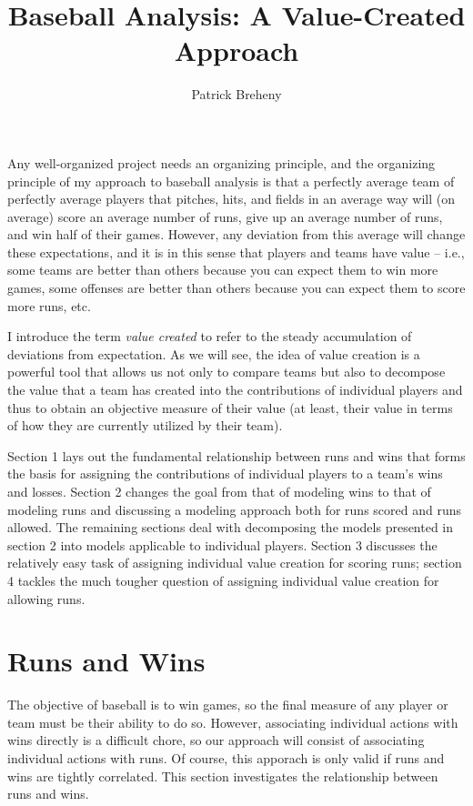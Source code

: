 \documentclass[a4paper,twoside,12pt]{article}
\title{Baseball Analysis: A Value-Created Approach}
\author{Patrick Breheny}
\date{}
\begin{document}
  

\newcommand{\minisection}[1]{\noindent \emph{#1}}

\setlength{\voffset}{0.5in}

\maketitle

Any well-organized project needs an organizing principle, and the organizing principle of my approach to baseball analysis is that a perfectly average team of perfectly average players that pitches, hits, and fields in an average way will (on average) score an average number of runs, give up an average number of runs, and win half of their games.  However, any deviation from this average will change these expectations, and it is in this sense that players and teams have value -- i.e., some teams are better than others because you can expect them to win more games, some offenses are better than others because you can expect them to score more runs, etc.

I introduce the term \emph{value created} to refer to the steady accumulation of deviations from expectation.  As we will see, the idea of value creation is a powerful tool that allows us not only to compare teams but also to decompose the value that a team has created into the contributions of individual players and thus to obtain an objective measure of their value (at least, their value in terms of how they are currently utilized by their team).

Section 1 lays out the fundamental relationship between runs and wins that forms the basis for assigning the contributions of individual players to a team's wins and losses.  Section 2 changes the goal from that of modeling wins to that of modeling runs and discussing a modeling approach both for runs scored and runs allowed.  The remaining sections deal with decomposing the models presented in section 2 into models applicable to individual players.  Section 3 discusses the relatively easy task of assigning individual value creation for scoring runs; section 4 tackles the much tougher question of assigning individual value creation for allowing runs.

\section{Runs and Wins}

The objective of baseball is to win games, so the final measure of any player or team must be their ability to do so.  However, associating individual actions with wins directly is a difficult chore, so our approach will consist of associating individual actions with runs.  Of course, this apporach is only valid if runs and wins are tightly correlated.  This section investigates the relationship between runs and wins.
\end{document}
